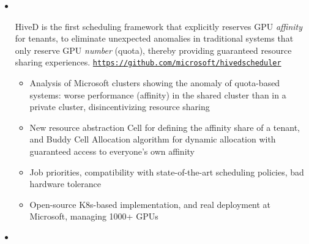   \begin{itemize}[leftmargin=*]
    \item
      \vspace{-10pt}\\
      {
          HiveD is the first scheduling framework that explicitly reserves GPU \textit{affinity} for tenants, to eliminate unexpected anomalies in traditional systems that only reserve GPU \textit{number} (quota), thereby providing guaranteed resource sharing experiences. \texttt{\url{https://github.com/microsoft/hivedscheduler}}

          \vspace{-5pt}
          \begin{itemize}[leftmargin=*]
            \item Analysis of Microsoft clusters showing the anomaly of quota-based systems: worse performance (affinity) in the shared cluster than in a private cluster, disincentivizing resource sharing
            \item New resource abstraction Cell for defining the affinity share of a tenant, and Buddy Cell Allocation algorithm for dynamic allocation with guaranteed access to everyone's own affinity
            \item Job priorities, compatibility with state-of-the-art scheduling policies, bad hardware tolerance
            \item Open-source K8s-based implementation, and real deployment at Microsoft, managing 1000+ GPUs
          \end{itemize}
      }
    \item
      \vspace{-10pt}\\
      {

}
\end{itemize}
